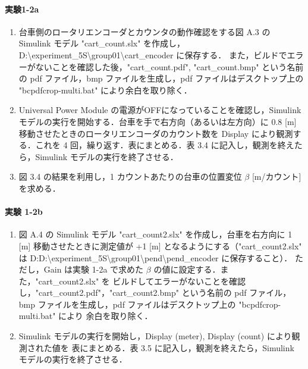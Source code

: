 \paragraph{実験1-2a}
\begin{enumerate}
  \item 台車側のロータリエンコーダとカウンタの動作確認をする図 A.3 の Simulink モデル
        "cart\_count.slx" を作成し，D:\textbackslash experiment\_5S\textbackslash group01\textbackslash cart\_encoder に保存する．
        また，ビルドでエラーがないことを確認した後，"cart\_count.pdf", "cart\_count.bmp" 
        という名前の pdf ファイル，bmp ファイルを生成し，pdf ファイルはデスクトップ上の 
        "bcpdfcrop-multi.bat" により余白を取り除く．
        
  \item Universal Power Module の電源がOFFになっていることを確認し，Simulink モデルの実行を開始する．台車を手で右方向（あるいは左方向）に 0.8 [m] 移動させたときのロータリエンコーダのカウント数を Display により観測する．これを 4 回，繰り返す．表にまとめる．表 3.4 に記入し，観測を終えたら，Simulink モデルの実行を終了させる．
        
  \item 図 3.4 の結果を利用し，1 カウントあたりの台車の位置変位 \( \beta \) [m/カウント] を求める．
\end{enumerate}

\paragraph{実験 1-2b}
\begin{enumerate}
  \item 図 A.4 の Simulink モデル "cart\_count2.slx" を作成し，台車を右方向に 1 [m] 移動させたときに測定値が
        +1 [m] となるようにする（"cart\_count2.slx" は D:D:\textbackslash experiment\_5S\textbackslash group01\textbackslash pend\textbackslash pend\_encoder に保存すること）．
        ただし，Gain は実験 1-2a で求めた \(\beta\) の値に設定する．また，"cart\_count2.slx" を
        ビルドしてエラーがないことを確認し，"cart\_count2.pdf"，"cart\_count2.bmp" という名前の 
        pdf ファイル，bmp ファイルを生成し，pdf ファイルはデスクトップ上の "bcpdfcrop-multi.bat" により
        余白を取り除く．\\
        
  \item Simulink モデルの実行を開始し，Display (meter), Display (count) により観測された値を
        表にまとめる．表 3.5 に記入し，観測を終えたら，Simulink モデルの実行を終了させる．
        
\end{enumerate}


